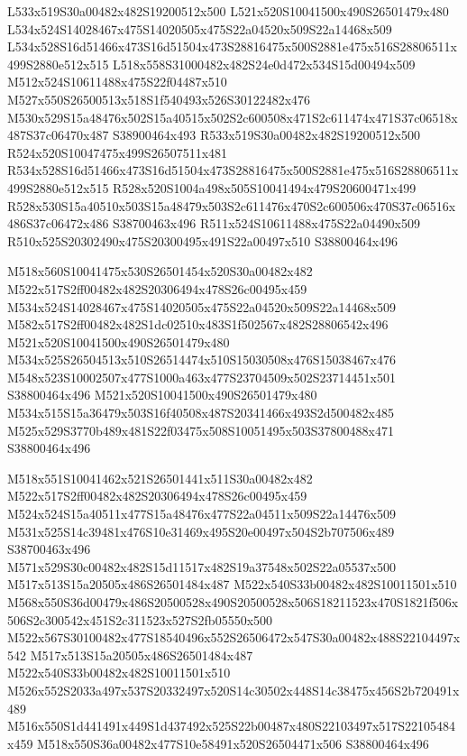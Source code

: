 \documentclass{article}
\begin{document}
\begin{multicols}{2}
L533x519S30a00482x482S19200512x500 L521x520S10041500x490S26501479x480 L534x524S14028467x475S14020505x475S22a04520x509S22a14468x509 L534x528S16d51466x473S16d51504x473S28816475x500S2881e475x516S28806511x499S2880e512x515 L518x558S31000482x482S24e0d472x534S15d00494x509 M512x524S10611488x475S22f04487x510 M527x550S26500513x518S1f540493x526S30122482x476 M530x529S15a48476x502S15a40515x502S2c600508x471S2c611474x471S37c06518x487S37c06470x487 S38900464x493 R533x519S30a00482x482S19200512x500 R524x520S10047475x499S26507511x481 R534x528S16d51466x473S16d51504x473S28816475x500S2881e475x516S28806511x499S2880e512x515 R528x520S1004a498x505S10041494x479S20600471x499 R528x530S15a40510x503S15a48479x503S2c611476x470S2c600506x470S37c06516x486S37c06472x486 S38700463x496 R511x524S10611488x475S22a04490x509 R510x525S20302490x475S20300495x491S22a00497x510 S38800464x496

M518x560S10041475x530S26501454x520S30a00482x482 M522x517S2ff00482x482S20306494x478S26c00495x459 M534x524S14028467x475S14020505x475S22a04520x509S22a14468x509 M582x517S2ff00482x482S1dc02510x483S1f502567x482S28806542x496 M521x520S10041500x490S26501479x480 M534x525S26504513x510S26514474x510S15030508x476S15038467x476 M548x523S10002507x477S1000a463x477S23704509x502S23714451x501 S38800464x496 M521x520S10041500x490S26501479x480 M534x515S15a36479x503S16f40508x487S20341466x493S2d500482x485 M525x529S3770b489x481S22f03475x508S10051495x503S37800488x471 S38800464x496

M518x551S10041462x521S26501441x511S30a00482x482 M522x517S2ff00482x482S20306494x478S26c00495x459 M524x524S15a40511x477S15a48476x477S22a04511x509S22a14476x509 M531x525S14c39481x476S10e31469x495S20e00497x504S2b707506x489 S38700463x496 M571x529S30c00482x482S15d11517x482S19a37548x502S22a05537x500 M517x513S15a20505x486S26501484x487 M522x540S33b00482x482S10011501x510 M568x550S36d00479x486S20500528x490S20500528x506S18211523x470S1821f506x506S2c300542x451S2c311523x527S2fb05550x500 M522x567S30100482x477S18540496x552S26506472x547S30a00482x488S22104497x542 M517x513S15a20505x486S26501484x487 M522x540S33b00482x482S10011501x510 M526x552S2033a497x537S20332497x520S14c30502x448S14c38475x456S2b720491x489 M516x550S1d441491x449S1d437492x525S22b00487x480S22103497x517S22105484x459 M518x550S36a00482x477S10e58491x520S26504471x506 S38800464x496


\end{multicols}
\end{document}

